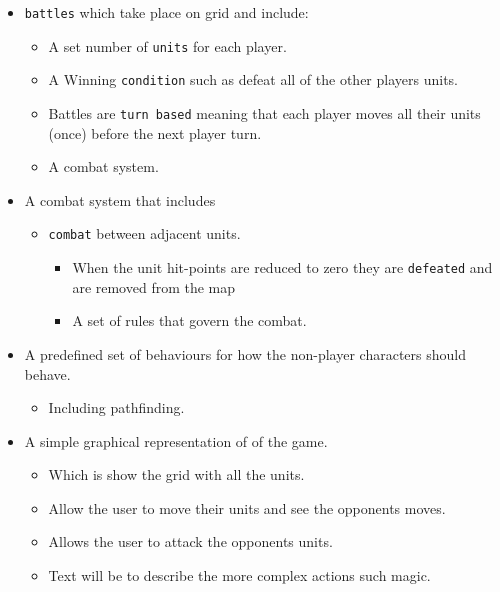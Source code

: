\begin{itemize}
\begin{itemize}
	\item \texttt{battles} which take place on grid and include:
	\begin{itemize}
		\item A set number of \texttt{units} for each player.
		\item A Winning \texttt{condition} such as defeat all of the other players units.
		\item Battles are \texttt{turn based} meaning that each player moves all their units (once) before the next player turn.   
		\item A combat system.
	\end{itemize}
	
	\item A combat system that includes
		\begin{itemize}
			\item \texttt{combat} between adjacent units.
			\begin{itemize}
				\item When the unit hit-points are reduced to zero they are \texttt{defeated} and are removed from the map
			\item A set of rules that govern the combat.
			\end{itemize}
			
		\end{itemize}
	
	\item A predefined set of behaviours for how the non-player characters should behave.
	\begin{itemize}
		\item Including pathfinding.
	\end{itemize}
	
	\item A simple graphical representation of of the game.
	\begin{itemize}
		\item Which is show the grid with all the units.
		\item Allow the user to move their units and see the opponents moves.
		\item Allows the user to attack the opponents units.
		\item Text will be to describe the more complex actions such magic.
	\end{itemize}
\end{itemize}
\end{itemize}

